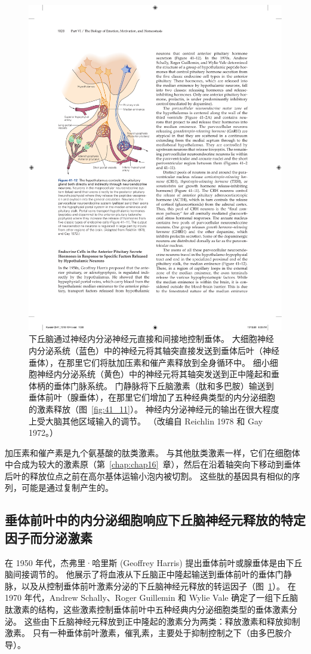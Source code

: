 \begin{figure}[htbp]
	\centering
	\includegraphics[width=0.5\linewidth]{chap41/fig_41_12}
	\caption{下丘脑通过神经内分泌神经元直接和间接地控制垂体。
		大细胞神经内分泌系统（蓝色）中的神经元将其轴突直接发送到垂体后叶（神经垂体），在那里它们将肽加压素和催产素释放到全身循环中。
		细小细胞神经内分泌系统（黄色）中的神经元将其轴突发送到正中隆起和垂体柄的垂体门脉系统。
		门静脉将下丘脑激素（肽和多巴胺）输送到垂体前叶（腺垂体），在那里它们增加了五种经典类型的内分泌细胞的激素释放（图~\ref{fig:41_11}）。
		神经内分泌神经元的输出在很大程度上受大脑其他区域输入的调节。 （改编自 Reichlin 1978 和 Gay 1972。）}
	\label{fig:41_12}
\end{figure}


加压素和催产素是九个氨基酸的肽类激素。
与其他肽类激素一样，它们在细胞体中合成为较大的激素原（第~\ref{chap:chap16}~章），然后在沿着轴突向下移动到垂体后叶的释放位点之前在高尔基体运输小泡内被切割。
这些肽的基因具有相似的序列，可能是通过复制产生的。



\subsection{垂体前叶中的内分泌细胞响应下丘脑神经元释放的特定因子而分泌激素}

在 1950 年代，杰弗里·哈里斯 (Geoffrey Harris) 提出垂体前叶或腺垂体是由下丘脑间接调节的。
他展示了将血液从下丘脑正中隆起输送到垂体前叶的垂体门静脉，以及从控制垂体前叶激素分泌的下丘脑神经元释放的转运因子（图~\ref{fig:41_12}）。
在 1970 年代，Andrew Schally、Roger Guillemin 和 Wylie Vale 确定了一组下丘脑肽激素的结构，这些激素控制垂体前叶中五种经典内分泌细胞类型的垂体激素分泌。
这些由下丘脑神经元释放到正中隆起的激素分为两类：释放激素和释放抑制激素。
只有一种垂体前叶激素，催乳素，主要处于抑制控制之下（由多巴胺介导）。


